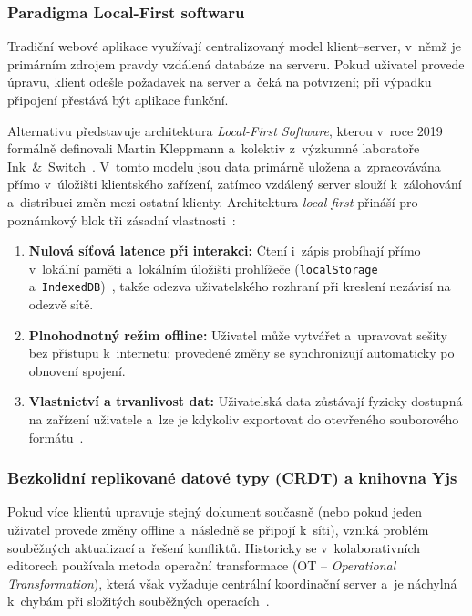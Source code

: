 \documentclass[12pt, a4paper, oneside]{article}
\begin{document}
\subsubsection{Paradigma Local-First softwaru}
\label{sec:teorie_local_first}

Tradiční webové aplikace využívají centralizovaný model klient--server, v~němž je primárním zdrojem pravdy vzdálená databáze na serveru. Pokud uživatel provede úpravu, klient odešle požadavek na server a~čeká na potvrzení; při výpadku připojení přestává být aplikace funkční.

Alternativu představuje architektura \textit{Local-First Software}, kterou v~roce 2019 formálně definovali Martin Kleppmann a~kolektiv z~výzkumné laboratoře Ink~\&~Switch~\cite{kleppmann2019local}. V~tomto modelu jsou data primárně uložena a~zpracovávána přímo v~úložišti klientského zařízení, zatímco vzdálený server slouží k~zálohování a~distribuci změn mezi ostatní klienty. Architektura \textit{local-first} přináší pro poznámkový blok tři zásadní vlastnosti~\cite{kleppmann2019local}:
\begin{enumerate}
    \item \textbf{Nulová síťová latence při interakci:} Čtení i~zápis probíhají přímo v~lokální paměti a~lokálním úložišti prohlížeče (\texttt{localStorage} a~\texttt{IndexedDB})~\cite{whatwg_storage, w3c_indexeddb}, takže odezva uživatelského rozhraní při kreslení nezávisí na odezvě sítě.
    \item \textbf{Plnohodnotný režim offline:} Uživatel může vytvářet a~upravovat sešity bez přístupu k~internetu; provedené změny se synchronizují automaticky po obnovení spojení.
    \item \textbf{Vlastnictví a trvanlivost dat:} Uživatelská data zůstávají fyzicky dostupná na zařízení uživatele a~lze je kdykoliv exportovat do otevřeného souborového formátu~\cite{kleppmann2019local}.
\end{enumerate}

\subsubsection{Bezkolidní replikované datové typy (CRDT) a knihovna Yjs}
\label{sec:teorie_crdt}

Pokud více klientů upravuje stejný dokument současně (nebo pokud jeden uživatel provede změny offline a~následně se připojí k~síti), vzniká problém souběžných aktualizací a~řešení konfliktů. Historicky se v~kolaborativních editorech používala metoda operační transformace (OT -- \textit{Operational Transformation}), která však vyžaduje centrální koordinační server a~je náchylná k~chybám při složitých souběžných operacích~\cite{kleppmann2019local}.
\end{document}
